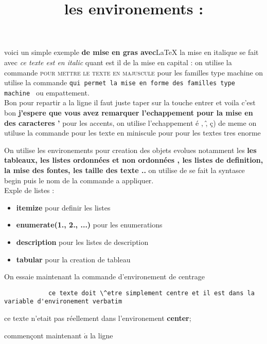 \documentclass{article}
\begin{document}
	voici un simple exemple \textbf{de mise en gras avec}\LaTeX{} la mise en italique se fait avec \textit{ce texte est en italic} quant est il de la mise en capital : on utilise la commande \textsc{pour mettre le texte en majuscule} pour les familles type machine on utilise la commande \texttt{qui permet la mise en forme des familles type machine } ou \textsf{empattement}.\\
	
		Bon pour repartir a la ligne il faut juste taper sur la touche entrer et voila c'est bon \textbf{j'espere que vous avez remarquer
    l'echappement pour la mise en des caracteres '} pour les accents, on utilise l'echappement \textsf{ \large \'e , \^ , \c{c})} de meme on utiluse la commande {\tiny pour les texte en miniscule} pour {\huge pour les textes tres enorme}\\
		\title{les environements : }
	On utilise les environements pour creation des objets evolues notamment les \textbf{les tableaux, les listes ordonn\'ees et non ordonn\'ees , les listes de definition, la mise des fontes, les taille des texte ..} on utilise de se fait la syntasce begin{} puis le nom de la commande a appliquer.\\
	Exple de listes :
	\begin{itemize}
		
		\item \textbf{itemize} pour definir les listes
		\item \textbf{enumerate(1., 2., ...) }pour les enumerations
		\item \textbf{description} pour les listes de description
		\item \textbf{tabular} pour la creation de tableau
	\end{itemize}		 
	On essaie maintenant la commande d'environement de centrage
	\begin{center}
		\begin{verbatim}
			ce texte doit \^etre simplement centre et il est dans la variable d'environement verbatim 
		\end{verbatim}
ce texte n'etait pas r\'eellement dans l'environement \textbf{center};
	\end{center}

commen\c{c}ont maintenant $\acute{a}$ la ligne
\end{document}
